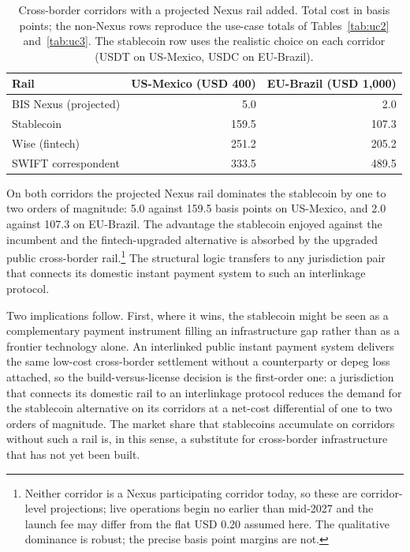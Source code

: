 \begin{table}[H]
\centering
\caption{Cross-border corridors with a projected Nexus rail added. Total cost in basis points; the non-Nexus rows reproduce the use-case totals of Tables~\ref{tab:uc2} and~\ref{tab:uc3}. The stablecoin row uses the realistic choice on each corridor (USDT on US-Mexico, USDC on EU-Brazil).}\label{tab:nexus_cross_border}
\begin{tabular}{lrr}
\toprule
Rail & US-Mexico (USD 400) & EU-Brazil (USD 1{,}000) \\
\midrule
BIS Nexus (projected) & 5.0   & 2.0   \\
Stablecoin            & 159.5 & 107.3 \\
Wise (fintech)        & 251.2 & 205.2 \\
SWIFT correspondent   & 333.5 & 489.5 \\
\bottomrule
\end{tabular}
\end{table}

On both corridors the projected Nexus rail dominates the stablecoin by one to two orders of magnitude: 5.0 against 159.5 basis points on US-Mexico, and 2.0 against 107.3 on EU-Brazil. The advantage the stablecoin enjoyed against the incumbent and the fintech-upgraded alternative is absorbed by the upgraded public cross-border rail.\footnote{Neither corridor is a Nexus participating corridor today, so these are corridor-level projections; live operations begin no earlier than mid-2027 and the launch fee may differ from the flat USD 0.20 assumed here. The qualitative dominance is robust; the precise basis point margins are not.} The structural logic transfers to any jurisdiction pair that connects its domestic instant payment system to such an interlinkage protocol.

Two implications follow. First, where it wins, the stablecoin might be seen as a complementary payment instrument filling an infrastructure gap rather than as a frontier technology alone. An interlinked public instant payment system delivers the same low-cost cross-border settlement without a counterparty or depeg loss attached, so the build-versus-license decision is the first-order one: a jurisdiction that connects its domestic rail to an interlinkage protocol reduces the demand for the stablecoin alternative on its corridors at a net-cost differential of one to two orders of magnitude. The market share that stablecoins accumulate on corridors without such a rail is, in this sense, a substitute for cross-border infrastructure that has not yet been built.

